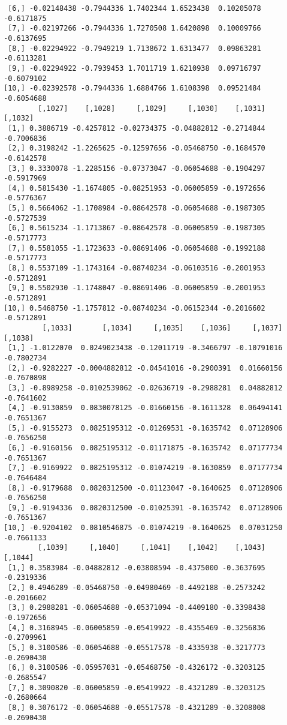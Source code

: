 \documentclass[
  letterpaper,
  DIV=11,
  numbers=noendperiod]{scrreprt}
\begin{document}
\begin{verbatim}
 [6,] -0.02148438 -0.7944336 1.7402344 1.6523438  0.10205078 -0.6171875
 [7,] -0.02197266 -0.7944336 1.7270508 1.6420898  0.10009766 -0.6137695
 [8,] -0.02294922 -0.7949219 1.7138672 1.6313477  0.09863281 -0.6113281
 [9,] -0.02294922 -0.7939453 1.7011719 1.6210938  0.09716797 -0.6079102
[10,] -0.02392578 -0.7944336 1.6884766 1.6108398  0.09521484 -0.6054688
        [,1027]    [,1028]     [,1029]     [,1030]    [,1031]    [,1032]
 [1,] 0.3886719 -0.4257812 -0.02734375 -0.04882812 -0.2714844 -0.7006836
 [2,] 0.3198242 -1.2265625 -0.12597656 -0.05468750 -0.1684570 -0.6142578
 [3,] 0.3330078 -1.2285156 -0.07373047 -0.06054688 -0.1904297 -0.5917969
 [4,] 0.5815430 -1.1674805 -0.08251953 -0.06005859 -0.1972656 -0.5776367
 [5,] 0.5664062 -1.1708984 -0.08642578 -0.06054688 -0.1987305 -0.5727539
 [6,] 0.5615234 -1.1713867 -0.08642578 -0.06005859 -0.1987305 -0.5717773
 [7,] 0.5581055 -1.1723633 -0.08691406 -0.06054688 -0.1992188 -0.5717773
 [8,] 0.5537109 -1.1743164 -0.08740234 -0.06103516 -0.2001953 -0.5712891
 [9,] 0.5502930 -1.1748047 -0.08691406 -0.06005859 -0.2001953 -0.5712891
[10,] 0.5468750 -1.1757812 -0.08740234 -0.06152344 -0.2016602 -0.5712891
         [,1033]       [,1034]     [,1035]    [,1036]     [,1037]    [,1038]
 [1,] -1.0122070  0.0249023438 -0.12011719 -0.3466797 -0.10791016 -0.7802734
 [2,] -0.9282227 -0.0004882812 -0.04541016 -0.2900391  0.01660156 -0.7670898
 [3,] -0.8989258 -0.0102539062 -0.02636719 -0.2988281  0.04882812 -0.7641602
 [4,] -0.9130859  0.0830078125 -0.01660156 -0.1611328  0.06494141 -0.7651367
 [5,] -0.9155273  0.0825195312 -0.01269531 -0.1635742  0.07128906 -0.7656250
 [6,] -0.9160156  0.0825195312 -0.01171875 -0.1635742  0.07177734 -0.7651367
 [7,] -0.9169922  0.0825195312 -0.01074219 -0.1630859  0.07177734 -0.7646484
 [8,] -0.9179688  0.0820312500 -0.01123047 -0.1640625  0.07128906 -0.7656250
 [9,] -0.9194336  0.0820312500 -0.01025391 -0.1635742  0.07128906 -0.7651367
[10,] -0.9204102  0.0810546875 -0.01074219 -0.1640625  0.07031250 -0.7661133
        [,1039]     [,1040]     [,1041]    [,1042]    [,1043]    [,1044]
 [1,] 0.3583984 -0.04882812 -0.03808594 -0.4375000 -0.3637695 -0.2319336
 [2,] 0.4946289 -0.05468750 -0.04980469 -0.4492188 -0.2573242 -0.2016602
 [3,] 0.2988281 -0.06054688 -0.05371094 -0.4409180 -0.3398438 -0.1972656
 [4,] 0.3168945 -0.06005859 -0.05419922 -0.4355469 -0.3256836 -0.2709961
 [5,] 0.3100586 -0.06054688 -0.05517578 -0.4335938 -0.3217773 -0.2690430
 [6,] 0.3100586 -0.05957031 -0.05468750 -0.4326172 -0.3203125 -0.2685547
 [7,] 0.3090820 -0.06005859 -0.05419922 -0.4321289 -0.3203125 -0.2680664
 [8,] 0.3076172 -0.06054688 -0.05517578 -0.4321289 -0.3208008 -0.2690430

\end{verbatim}
\end{document}
